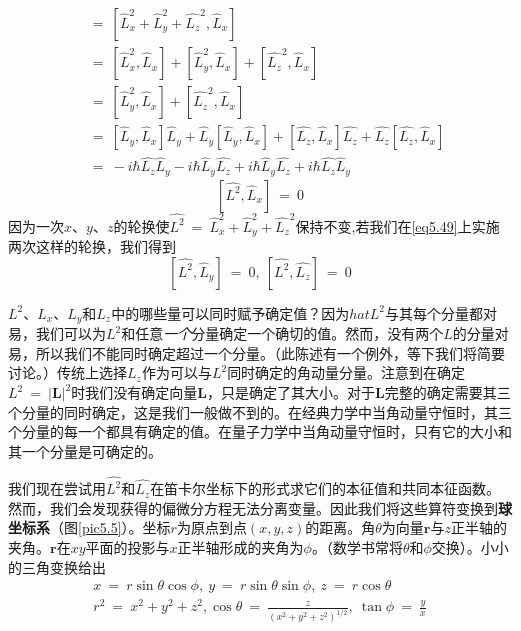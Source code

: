 \documentclass[12pt,a4paper,openany]{ctexbook}
\newcommand{\abs}[1]{\left| #1 \right|}
\newcommand{\pv}{\boldsymbol{r}} %
\newcommand{\amv}{\boldsymbol{L}} %
\begin{document}
\begin{flushleft}
\begin{align*}
    [\hat{L^2},\hat{L}_x]\ &=\ [\hat{L}_x^2+\hat{L}_y^2+\hat{L_z}^2,\hat{L}_x] \\
    &=\ [\hat{L}_x^2,\hat{L}_x]+[\hat{L}_y^2,\hat{L}_x]+[\hat{L_z}^2,\hat{L}_x] \\
    &=\ [\hat{L}_y^2,\hat{L}_x]+[\hat{L_z}^2,\hat{L}_x] \\
    &=\ [\hat{L}_y,\hat{L}_x]\hat{L}_y+\hat{L}_y[\hat{L}_y,\hat{L}_x]+[\hat{L_z},\hat{L}_x]\hat{L_z}+\hat{L_z}[\hat{L_z},\hat{L}_x] \\
    &=\ -i\hbar\hat{L_z}\hat{L}_y-i\hbar\hat{L}_y\hat{L_z}+i\hbar\hat{L}_y\hat{L_z}+i\hbar\hat{L_z}\hat{L}_y
\end{align*}
\begin{equation}
    \boxed{[\hat{L^2},\hat{L}_x]\ =\ 0} \label{eq5.49}
\end{equation}
因为一次$x$、$y$、$z$的轮换使$\hat{L^2}\ =\ \hat{L}_x^2+\hat{L}_y^2+\hat{L_z}^2$保持不变,若我们在\eqref{eq5.49}上实施两次这样的轮换，我们得到
\begin{equation}
    \boxed{[\hat{L^2},\hat{L}_y]\ =\ 0,\ [\hat{L^2},\hat{L_z}]\ =\ 0} \label{eq5.50}
\end{equation}

$L^2$、$L_x$、$L_y$和$L_z$中的哪些量可以同时赋予确定值？因为$hat{L}^2$与其每个分量都对易，我们可以为$L^2$和任意\textit{一个}分量确定一个确切的值。然而，没有两个$\hat{L}$的分量对易，所以我们不能同时确定超过一个分量。（此陈述有一个例外，等下我们将简要讨论。）传统上选择$L_z$作为可以与$L^2$同时确定的角动量分量。注意到在确定$L^2\ =\ \abs{\amv}^2$时我们没有确定向量$\amv$，只是确定了其大小。对于$\amv$完整的确定需要其三个分量的同时确定，这是我们一般做不到的。在经典力学中当角动量守恒时，其三个分量的每一个都具有确定的值。在量子力学中当角动量守恒时，只有它的大小和其一个分量是可确定的。

我们现在尝试用$\hat{L^2}$和$\hat{L_z}$在笛卡尔坐标下的形式求它们的本征值和共同本征函数。然而，我们会发现获得的偏微分方程无法分离变量。因此我们将这些算符变换到\textbf{球坐标系}（图\ref{pic5.5}）。坐标$r$为原点到点$(x,y,z)$的距离。角$\theta$为向量$\pv$与$z$正半轴的夹角。$\pv$在$xy$平面的投影与$x$正半轴形成的夹角为$\phi$。（数学书常将$\theta$和$\phi$交换）。小小的三角变换给出
\begin{gather}
    x\ =\ r\sin\theta\cos\phi,\ y\ =\ r\sin\theta\sin\phi,\ z\ =\ r\cos\theta \label{eq5.51} \\
    r^2\ =\ x^2+y^2+z^2,\cos\theta\ =\ \frac{z}{(x^2+y^2+z^2)^{1/2}},\ \tan\phi\ =\ \frac{y}{x} \label{eq5.52}
\end{gather}


\end{flushleft}
\end{document}
